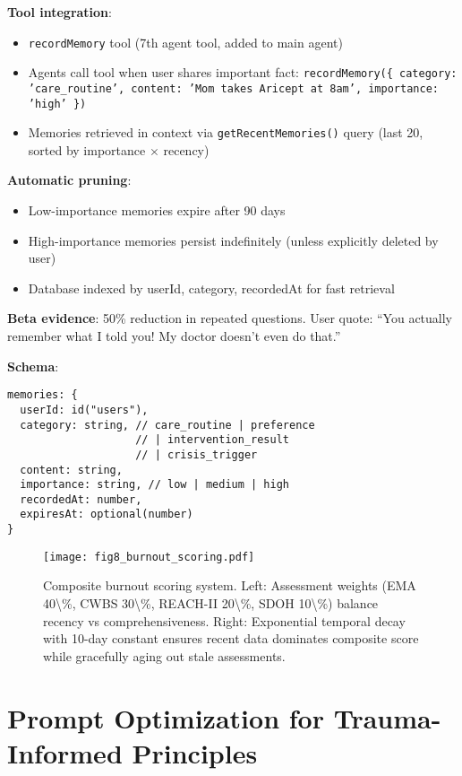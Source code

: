\documentclass{article}
\begin{document}
\textbf{Tool integration}:
\begin{itemize}
    \item \texttt{recordMemory} tool (7th agent tool, added to main agent)
    \item Agents call tool when user shares important fact: \texttt{recordMemory(\{ category: 'care\_routine', content: 'Mom takes Aricept at 8am', importance: 'high' \})}
    \item Memories retrieved in context via \texttt{getRecentMemories()} query (last 20, sorted by importance $\times$ recency)
\end{itemize}

\textbf{Automatic pruning}:
\begin{itemize}
    \item Low-importance memories expire after 90 days
    \item High-importance memories persist indefinitely (unless explicitly deleted by user)
    \item Database indexed by userId, category, recordedAt for fast retrieval
\end{itemize}

\textbf{Beta evidence}: 50\% reduction in repeated questions. User quote: ``You actually remember what I told you! My doctor doesn't even do that.''

\textbf{Schema}:
\begin{verbatim}
memories: {
  userId: id("users"),
  category: string, // care_routine | preference
                    // | intervention_result
                    // | crisis_trigger
  content: string,
  importance: string, // low | medium | high
  recordedAt: number,
  expiresAt: optional(number)
}
\end{verbatim}

%
\begin{figure}[htbp]%
\centering%
\texttt{[image: fig8\_burnout\_scoring.pdf]}%
\caption{Composite burnout scoring system. Left: Assessment weights (EMA 40\textbackslash{}\%, CWBS 30\textbackslash{}\%, REACH{-}II 20\textbackslash{}\%, SDOH 10\textbackslash{}\%) balance recency vs comprehensiveness. Right: Exponential temporal decay with 10{-}day constant ensures recent data dominates composite score while gracefully aging out stale assessments.}%
\label{fig:burnout}%
\end{figure}%
\section{Prompt Optimization for Trauma{-}Informed Principles}%
\label{sec:PromptOptimizationforTrauma{-}InformedPrinciples}%
%
\end{document}

